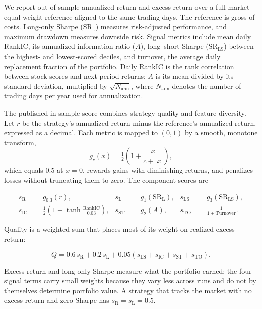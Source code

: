 We report out-of-sample annualized return and excess return over a full-market equal-weight reference aligned to the same trading days. The reference is gross of costs. Long-only Sharpe ($\mathrm{SR}_{\mathrm{L}}$) measures risk-adjusted performance, and maximum drawdown measures downside risk. Signal metrics include mean daily RankIC, its annualized information ratio ($A$), long--short Sharpe ($\mathrm{SR}_{\mathrm{LS}}$) between the highest- and lowest-scored deciles, and turnover, the average daily replacement fraction of the portfolio. Daily RankIC is the rank correlation between stock scores and next-period returns; $A$ is its mean divided by its standard deviation, multiplied by $\sqrt{N_{\mathrm{ann}}}$, where $N_{\mathrm{ann}}$ denotes the number of trading days per year used for annualization.

The published in-sample score combines strategy quality and feature diversity. Let $r$ be the strategy's annualized return minus the reference's annualized return, expressed as a decimal. Each metric is mapped to $(0,1)$ by a smooth, monotone transform,
\[
g_c(x)=\tfrac12\left(1+\frac{x}{c+|x|}\right),
\]
which equals $0.5$ at $x=0$, rewards gains with diminishing returns, and penalizes losses without truncating them to zero. The component scores are

\begin{equation}
\begin{aligned}
s_{\mathrm{R}}&=g_{0.3}(r), &
s_{\mathrm{L}}&=g_{1}(\mathrm{SR}_{\mathrm{L}}), &
s_{\mathrm{LS}}&=g_{3}(\mathrm{SR}_{\mathrm{LS}}),\\
s_{\mathrm{IC}}&=\tfrac12\left(1+\tanh\frac{\mathrm{RankIC}}{0.03}\right), &
s_{\mathrm{ST}}&=g_{2}(A), &
s_{\mathrm{TO}}&=\frac{1}{1+\mathrm{Turnover}}.
\end{aligned}
\label{eq:terms}
\end{equation}

Quality is a weighted sum that places most of its weight on realized excess return:

\begin{equation}
Q=0.6\,s_{\mathrm{R}}+0.2\,s_{\mathrm{L}}+0.05\left(s_{\mathrm{LS}}+s_{\mathrm{IC}}+s_{\mathrm{ST}}+s_{\mathrm{TO}}\right).
\label{eq:quality}
\end{equation}

Excess return and long-only Sharpe measure what the portfolio earned; the four signal terms carry small weights because they vary less across runs and do not by themselves determine portfolio value. A strategy that tracks the market with no excess return and zero Sharpe has $s_{\mathrm{R}}=s_{\mathrm{L}}=0.5$.

